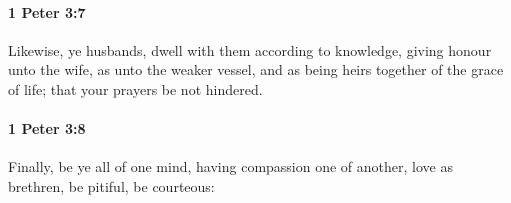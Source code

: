 		\paragraph{1 Peter 3:7} %
			\label{1PETER-3-7}

			Likewise, ye husbands, dwell with them according to knowledge, giving honour unto the wife, as unto the weaker vessel, and as being heirs together of the grace of life; that your prayers be not hindered.

			\begin{framed}
			\scriptsize
				\begin{compactdesc}
					\item[SBLG] 
				\end{compactdesc}
			\end{framed}

		\paragraph{1 Peter 3:8} %
			\label{1PETER-3-8}

			Finally, be ye all of one mind, having compassion one of another, love as brethren, be pitiful, be courteous:


